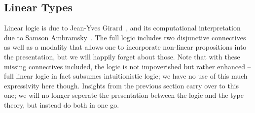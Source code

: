 \subsection{Linear Types}
Linear logic is due to Jean-Yves Girard~\cite{girard1987linear}, and its computational interpretation due to Samson Ambramsky~\cite{abramsky1993computational}.
The full logic includes two disjunctive connectives as well as a modality that allows one to incorporate non-linear propositions into the presentation, but we will happily forget about those.
Note that with these missing connectives included, the logic is not impoverished but rather enhanced -- full linear logic in fact subsumes intuitionistic logic; we have no use of this much expressivity here though.
Insights from the previous section carry over to this one; we will no longer seperate the presentation between the logic and the type theory, but instead do both in one go.

